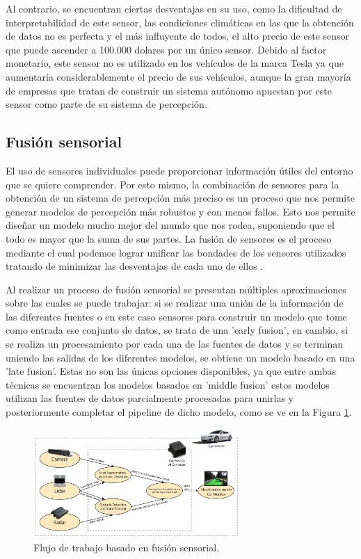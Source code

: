 Al contrario, se encuentran ciertas desventajas en su uso, como la dificultad de interpretabilidad de este sensor, las condiciones climáticas en las que la obtención de datos no es perfecta y el más influyente de todos, el alto precio de este sensor que puede ascender a 100.000 dolares por un único sensor. Debido al factor monetario, este sensor no es utilizado en los vehículos de la marca Tesla ya que aumentaría considerablemente el precio de sus vehículos, aunque la gran mayoría de empresas que tratan de construir un sistema autónomo apuestan por este sensor como parte de su sistema de percepción.

\subsection{Fusión sensorial}
\label{sec:Fusión sensorial}

El uso de sensores individuales puede proporcionar información útiles del entorno que se quiere comprender. Por esto mismo, la combinación de sensores para la obtención de un sistema de percepción más preciso es un proceso que nos permite generar modelos de percepción más robustos y con menos fallos. Esto nos permite diseñar un modelo mucho mejor del mundo que nos rodea, suponiendo que el todo es mayor que la suma de sus partes. La fusión de sensores es el proceso mediante el cual podemos lograr unificar las bondades de los sensores utilizados tratando de minimizar las desventajas de cada uno de ellos \cite{what_fusion}.

Al realizar un proceso de fusión sensorial se presentan múltiples aproximaciones sobre las cuales se puede trabajar: si se realizar una unión de la información de las diferentes fuentes o en este caso sensores para construir un modelo que tome como entrada ese conjunto de datos, se trata de una 'early fusion', en cambio, si se realiza un procesamiento por cada una de las fuentes de datos y se terminan uniendo las salidas de los diferentes modelos, se obtiene un modelo basado en una 'late fusion'. Estas no son las únicas opciones disponibles, ya que entre ambas técnicas se encuentran los modelos basados en 'middle fusion' estos modelos utilizan las fuentes de datos parcialmente procesadas para unirlas y posteriormente completar el pipeline de dicho modelo, como se ve en la Figura \ref{fig:Flujo de trabajo basado en fusión sensorial.}.

\begin{figure}[H]
    \centering
    \includegraphics[width=0.7\textwidth]{Book/figures/1_introduccion/ejemplo_fusion.png}
    \caption{Flujo de trabajo basado en fusión sensorial.}
    \label{fig:Flujo de trabajo basado en fusión sensorial.}
\end{figure}

